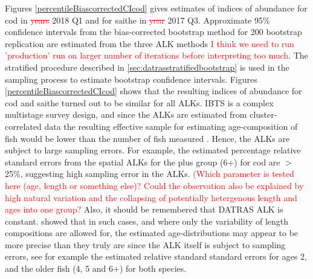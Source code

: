 \documentclass[a4paper 12pt]{article}
\numberwithin{equation}{section}
\newcommand{\ed}[1]{\textcolor{red}{#1}}
\begin{document}
{Figures \ref{percentileBiascorrectedCIcod} gives estimates of indices of abundance for cod in \ed{\sout{years}} 2018 Q1 and for saithe in \ed{\sout{year}} 2017 Q3. Approximate 95\% confidence intervals from the bias-corrected bootstrap method for 200 bootstrap replication are estimated from the three ALK methods \ed{I think we need to run 'production' run on larger number of iterations before interpreting too much}. The stratified procedure described in \ref{sec:datrasstratifiedbootstrap} is used in the sampling process to estimate bootstrap confidence intervals.   Figures \ref{percentileBiascorrectedCIcod}  shows that the resulting indices of abundance for cod and saithe turned out to be similar for all ALKs. IBTS is a complex multistage survey design, and since the ALKs are estimated from cluster-correlated data the resulting effective sample for estimating age-composition of fish would be lower than the number of fish measured \citep{ICES2013PICS3}. Hence, the ALKs are subject to large sampling errors. For example, the estimated percentage relative standard errors from the spatial ALKs for the plus group (6+) for cod are $>$ 25\%, suggesting high sampling error in the ALKs. \ed{(Which parameter is tested here (age, length or something else)? Could the observation also be explained by high natural variation and the collapsing of potentially hetergenous length and ages into one group?} Also, it should be remembered that DATRAS ALK is constant.   \citet{aanes2015efficient} showed that in such cases, and where only the variability of  length compositions are allowed for, the estimated age-distributions may appear to be more precise than they truly are since the ALK itself is subject to sampling errors, see for example the estimated relative standard standard errors for ages 2, and the older fish (4, 5 and 6+) for both species. 

\clearpage

}
\end{document}
